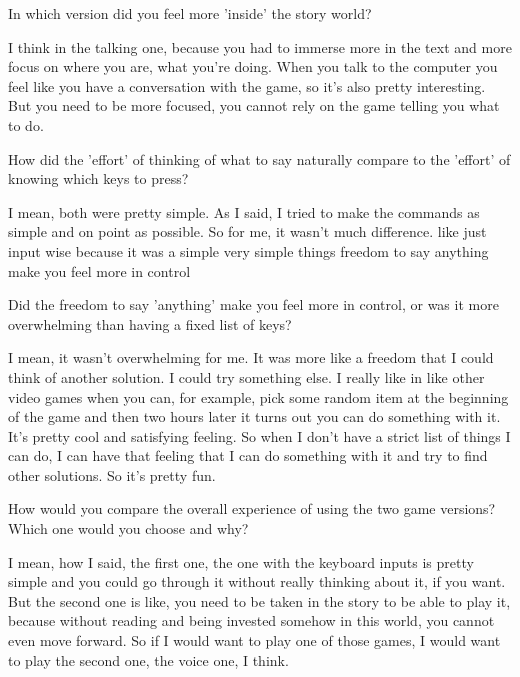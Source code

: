\begin{QandA}
   \item In which version did you feel more 'inside' the story world?
         \begin{answered}
            I think in the talking one, because you had to immerse more in the text and more focus on where you are, what you're doing.
            When you talk to the computer you feel like you have a conversation with the game, so it's also pretty interesting.
            But you need to be more focused, you cannot rely on the game telling you what to do.
         \end{answered}

   \item How did the 'effort' of thinking of what to say naturally compare to the 'effort' of knowing which keys to press?

         \begin{answered}
            I mean, both were pretty simple.
            As I said, I tried to make the commands as simple and on point as possible.
            So for me, it wasn't much difference.
            like just input wise because it was a simple very simple things freedom to say anything make you feel more in control
         \end{answered}

    \item Did the freedom to say 'anything' make you feel more in control, or was it more overwhelming than having a fixed list of keys?

         \begin{answered}
            I mean, it wasn't overwhelming for me.
            It was more like a freedom that I could think of another solution.
            I could try something else.
            I really like in like other video games when you can, for example, pick some random item at the beginning of the game and then two hours later it turns out you can do something with it.
            It's pretty cool and satisfying feeling.
            So when I don't have a strict list of things I can do, I can have that feeling that I can do something with it and try to find other solutions.
            So it's pretty fun.
         \end{answered}
    \item How would you compare the overall experience of using the two game versions? Which one would you choose and why?

         \begin{answered}
            I mean, how I said, the first one, the one with the keyboard inputs is pretty simple and you could go through it without really thinking about it, if you want.
            But the second one is like, you need to be taken in the story to be able to play it, because without reading and being invested somehow in this world, you cannot even move forward.
            So if I would want to play one of those games, I would want to play the second one, the voice one, I think.
         \end{answered}
\end{QandA}






